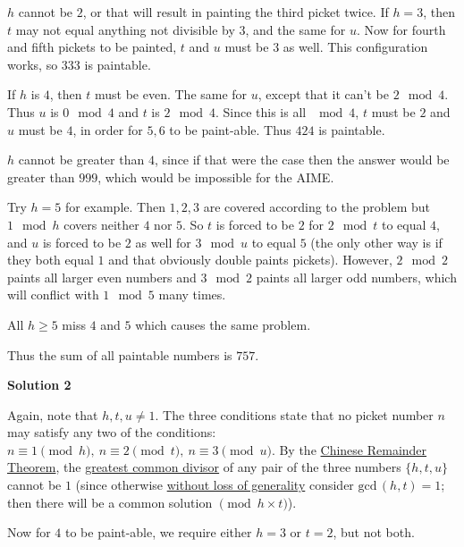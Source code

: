 \begin{enumerate}
 $h$ cannot be $2$, or that will result in painting the third picket twice. If $h=3$, then $t$ may not equal anything not divisible by $3$, and the same for $u$. Now for fourth and fifth pickets to be painted, $t$ and $u$ must be $3$ as well. This configuration works, so $333$ is paintable.

 If $h$ is $4$, then $t$ must be even. The same for $u$, except that it can't be $2 \mod 4$. Thus $u$ is $0 \mod 4$ and $t$ is $2 \mod 4$. Since this is all $\mod 4$, $t$ must be $2$ and $u$ must be $4$, in order for $5,6$ to be paint-able. Thus $424$ is paintable.

 $h$ cannot be greater than $4$, since if that were the case then the answer would be greater than $999$, which would be impossible for the AIME.

 Try $h=5$ for example. Then $1, 2, 3$ are covered according to the problem but $1\mod h$ covers neither $4$ nor $5$. So $t$ is forced to be $2$ for $2\mod t$ to equal $4$, and $u$ is forced to be $2$ as well for $3\mod u$ to equal $5$ (the only other way is if they both equal $1$ and that obviously double paints pickets). However, $2\mod 2$ paints all larger even numbers and $3\mod 2$ paints all larger odd numbers, which will conflict with $1 \mod 5$ many times.

 All $h \ge 5$ miss $4$ and $5$ which causes the same problem.

 Thus the sum of all paintable numbers is $\boxed{757}$.

 



\textbf{Solution 2}

Again, note that $h,t,u \neq 1$. The three conditions state that no picket number $n$ may satisfy any two of the conditions: $n \equiv 1 \pmod{h},\ n \equiv 2 \pmod{t},\ n \equiv 3 \pmod{u}$. By the \href{https://artofproblemsolving.com/wiki/index.php?title=Chinese\_Remainder\_Theorem}{Chinese Remainder Theorem}, the \href{https://artofproblemsolving.com/wiki/index.php?title=Greatest\_common\_divisor}{greatest common divisor} of any pair of the three numbers $\{h,t,u\}$ cannot be $1$ (since otherwise \href{https://artofproblemsolving.com/wiki/index.php?title=Without\_loss\_of\_generality}{without loss of generality} consider $\text{gcd}\,(h,t) = 1$; then there will be a common solution $\pmod{h \times t}$). 

 Now for $4$ to be paint-able, we require either $h = 3$ or $t=2$, but not both. 


\end{enumerate}
